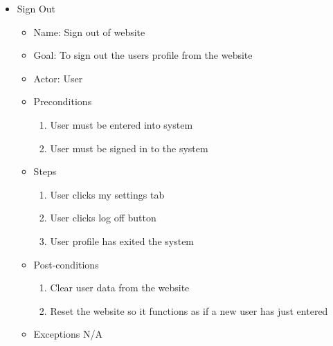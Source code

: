 \begin{itemize}
\item Sign Out
	\begin{itemize}
	\item Name: Sign out of website
    \item Goal: To sign out the users profile from the website
    \item Actor: User
    \item Preconditions
		\begin{enumerate}
		\item User must be entered into system
        \item User must be signed in to the system
        \end{enumerate}
    \item Steps
    	\begin{enumerate}
		\item User clicks my settings tab
        \item User clicks log off button
        \item User profile has exited the system
        \end{enumerate}
    \item Post-conditions
    	\begin{enumerate}
		\item Clear user data from the website
        \item Reset the website so it functions as if a new user has just entered 
        \end{enumerate}
    \item Exceptions N/A
    \end{itemize}
    
\end{itemize}